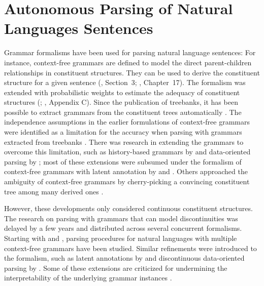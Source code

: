\documentclass[../document.tex]{subfiles}
\begin{document}
    \section*{Autonomous Parsing of Natural Languages Sentences}
    Grammar formalisms have been used for parsing natural language sentences:
        For instance, context-free grammars are defined to model the direct parent-children relationships in constituent structures.
        They can be used to derive the constituent structure for a given sentence (\citealp{Cho56}, Section~3; \citealp{Jur23}, Chapter~17).
        The formalism was extended with probabilistic weights to estimate the adequacy of constituent structures (\citealp{Sup72}; \citealp{Jur23}, Appendix C).
    Since the publication of treebanks, it has been possible to extract grammars from the constituent trees automatically \citep{Cha96}.
    The independence assumptions in the earlier formulations of context-free grammars were identified as a limitation for the accuracy when parsing with grammars extracted from treebanks \citep[e.g.\@][Section~1.1]{collins2001convolution}.
    There was research in extending the grammars to overcome this limitation, such as history-based grammars by \citet{Black94} and data-oriented parsing by \citet{Bod92}; most of these extensions were subsumed under the formalism of context-free grammars with latent annotation by \citet{Mat05} and \citet{Petrov06}.
    Others approached the ambiguity of context-free grammars by cherry-picking a convincing constituent tree among many derived ones \citep{Col00}.

    However, these developments only considered continuous constituent structures.
    The research on parsing with grammars that can model discontinuities was delayed by a few years and distributed across several concurrent formalisms.
    Starting with \citet{MaierSogaard08} and \citet{Kal10}, parsing procedures for natural languages with multiple context-free grammars have been studied.
    Similar refinements were introduced to the formalism, such as latent annotations by \citet{Geb20} and discontinuous data-oriented parsing by \citet{Cra11}.
    Some of these extensions are criticized for undermining the interpretability of the underlying grammar instances \citep[Chapter 9]{Geb20}.
\end{document}
